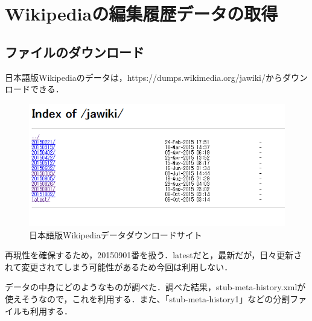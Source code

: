 \section{Wikipediaの編集履歴データの取得}

\subsection{ファイルのダウンロード}

日本語版Wikipediaのデータは，https://dumps.wikimedia.org/jawiki/からダウンロードできる．

\begin{figure}[H]
\centering
\includegraphics[width=14cm]{Index_of_jawiki.PNG}
\caption{日本語版Wikipediaデータダウンロードサイト}\label{サンプル図}
\end{figure}

再現性を確保するため，20150901番を扱う．latestだと，最新だが，日々更新されて変更されてしまう可能性があるため今回は利用しない．



データの中身にどのようなものが調べた．\cite{wikipedia_data_list}調べた結果，stub-meta-history.xmlが使えそうなので，これを利用する．また、「stub-meta-history1」などの分割ファイルも利用する．

